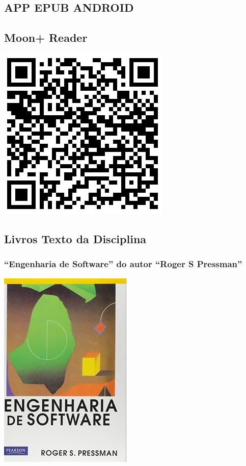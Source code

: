 \documentclass[
]{book}
\begin{document}
\subsection{APP EPUB ANDROID}\label{app-epub-android}

\subsection{\texorpdfstring{\textbf{Moon+ Reader}}{Moon+ Reader}}\label{moon-reader}

\includegraphics{images/qrcode/leitor_epub/MoonReaderPlus.jpg}

\subsection{Livros Texto da Disciplina}\label{livros-texto-da-disciplina}

\subsubsection{``Engenharia de Software'' do autor ``Roger S Pressman''}\label{engenharia-de-software-do-autor-roger-s-pressman}

\includegraphics{images/livros/engenharia_software_pressman.jpg}
\end{document}
